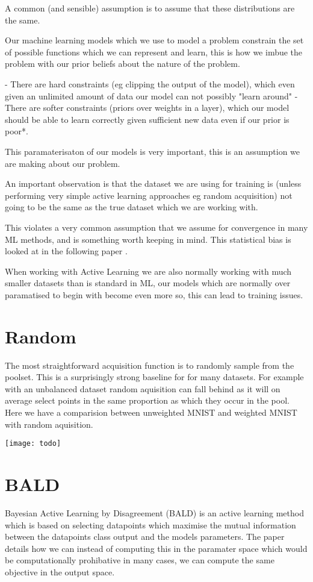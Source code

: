 \documentclass[12pt, a4paper]{report}
\theoremstyle{definition}
\begin{document}
A common (and sensible) assumption is to assume that these distributions are the same.

Our machine learning models which we use to model a problem constrain the set of possible functions which we can represent and learn, this is how we imbue the problem with our prior beliefs about the nature of the problem.

- There are hard constraints (eg clipping the output of the model), which even given an unlimited amount of data our model can not possibly "learn around"
- There are softer constraints (priors over weights in a layer), which our model should be able to learn correctly given sufficient new data even if our prior is poor*.

This paramaterisaton of our models is very important, this is an assumption we are making about our problem.

An important observation is that the dataset we are using for training is (unless performing very simple active learning approaches eg random acquisition) not going to be the same as the true dataset which we are working with. 

This violates a very common assumption that we assume for convergence in many ML methods, and is something worth keeping in mind. This statistical bias is looked at in the following paper \cite{farquhar2021statistical}.

When working with Active Learning we are also normally working with much smaller datasets than is standard in ML, our models which are normally over paramatised to begin with become even more so, this can lead to training issues.

\section{Random}

The most straightforward acquisition function is to randomly sample from the poolset. This is a surprisingly strong baseline for for many datasets. For example with an unbalanced dataset random aquisition can fall behind as it will on average select points in the same proportion as which they occur in the pool. Here we have a comparision between unweighted MNIST and weighted MNIST with random aquisition.

\texttt{[image: todo]}


\section{BALD}
Bayesian Active Learning by Disagreement (BALD) \cite{houlsby2011bayesian} is an active learning method which is based on selecting datapoints which maximise the mutual information between the datapoints class output and the models parameters. The paper details how we can instead of computing this in the paramater space which would be computationally prohibative in many cases, we can compute the same objective in the output space.
\end{document}
